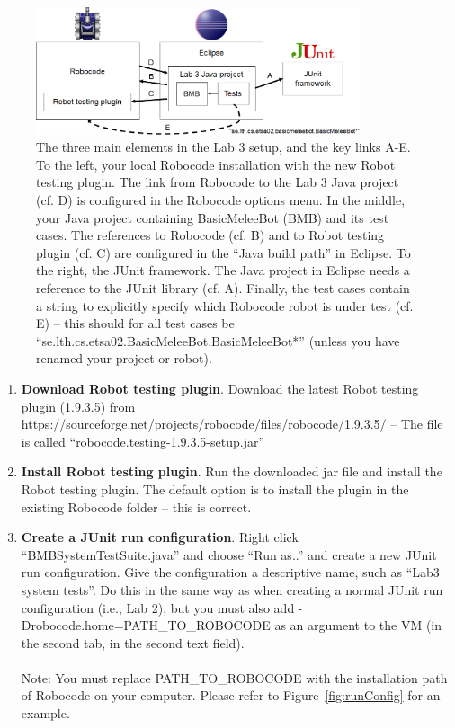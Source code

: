 \documentclass{scrreprt}
\begin{document}
\begin{figure}
\centering
\includegraphics[width=0.85\textwidth]{figures/overview.png}
\caption{The three main elements in the Lab 3 setup, and the key links A-E. To the left, your local Robocode installation with the new Robot testing plugin. The link from Robocode to the Lab 3 Java project (cf. D) is configured in the Robocode options menu. In the middle, your Java project containing BasicMeleeBot (BMB) and its test cases. The references to Robocode (cf. B) and to Robot testing plugin (cf. C) are configured in the ``Java build path'' in Eclipse. To the right, the JUnit framework. The Java project in Eclipse needs a reference to the JUnit library (cf. A). Finally, the test cases contain a string to explicitly specify which Robocode robot is under test (cf. E) -- this should for all test cases be ``se.lth.cs.etsa02.BasicMeleeBot.BasicMeleeBot*'' (unless you have renamed your project or robot).}
\label{fig:overview}
\end{figure}


\begin{enumerate}
\item \textbf{Download Robot testing plugin}. Download the latest Robot testing plugin (1.9.3.5) from https://sourceforge.net/projects/robocode/files/robocode/1.9.3.5/ -- The file is called ``robocode.testing-1.9.3.5-setup.jar''
\item \textbf{Install Robot testing plugin}. Run the downloaded jar file and 
install the Robot testing plugin. The default option is to install the plugin in the existing Robocode folder -- this is correct.
\item \textbf{Create a JUnit run configuration}. Right click ``BMBSystemTestSuite.java'' and choose ``Run as..'' and create a new JUnit run configuration. Give the configuration a descriptive name, such as ``Lab3 system tests''. Do this in the same way as when creating a normal JUnit run configuration (i.e., Lab 2), but you must also add -Drobocode.home=PATH\_TO\_ROBOCODE as an argument to the VM (in the second tab, in the second text field).\\\\Note: You must replace PATH\_TO\_ROBOCODE with the installation path of Robocode on your computer. Please refer to Figure~\ref{fig:runConfig} for an example.
\end{enumerate}
\end{document}
